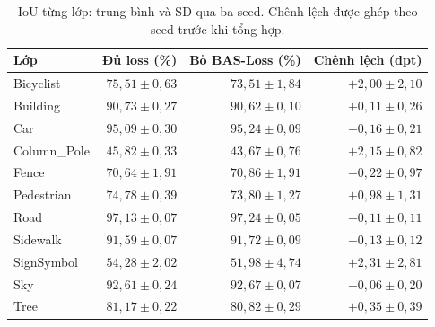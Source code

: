 \begin{table}[htbp]
\centering\small
\begin{tabularx}{\linewidth}{@{}Xrrr@{}}
\toprule
Lớp & Đủ loss (\%) & Bỏ BAS-Loss (\%) & Chênh lệch (đpt)\\
\midrule
Bicyclist & $75{,}51 \pm 0{,}63$ & $73{,}51 \pm 1{,}84$ & $+2{,}00 \pm 2{,}10$\\
Building & $90{,}73 \pm 0{,}27$ & $90{,}62 \pm 0{,}10$ & $+0{,}11 \pm 0{,}26$\\
Car & $95{,}09 \pm 0{,}30$ & $95{,}24 \pm 0{,}09$ & $-0{,}16 \pm 0{,}21$\\
Column\_Pole & $45{,}82 \pm 0{,}33$ & $43{,}67 \pm 0{,}76$ & $+2{,}15 \pm 0{,}82$\\
Fence & $70{,}64 \pm 1{,}91$ & $70{,}86 \pm 1{,}91$ & $-0{,}22 \pm 0{,}97$\\
Pedestrian & $74{,}78 \pm 0{,}39$ & $73{,}80 \pm 1{,}27$ & $+0{,}98 \pm 1{,}31$\\
Road & $97{,}13 \pm 0{,}07$ & $97{,}24 \pm 0{,}05$ & $-0{,}11 \pm 0{,}11$\\
Sidewalk & $91{,}59 \pm 0{,}07$ & $91{,}72 \pm 0{,}09$ & $-0{,}13 \pm 0{,}12$\\
SignSymbol & $54{,}28 \pm 2{,}02$ & $51{,}98 \pm 4{,}74$ & $+2{,}31 \pm 2{,}81$\\
Sky & $92{,}61 \pm 0{,}24$ & $92{,}67 \pm 0{,}07$ & $-0{,}06 \pm 0{,}20$\\
Tree & $81{,}17 \pm 0{,}22$ & $80{,}82 \pm 0{,}29$ & $+0{,}35 \pm 0{,}39$\\
\bottomrule
\end{tabularx}
\caption{IoU từng lớp: trung bình và SD qua ba seed. Chênh lệch được ghép theo seed trước khi tổng hợp.}
\label{tab:a2-per-class}
\end{table}
